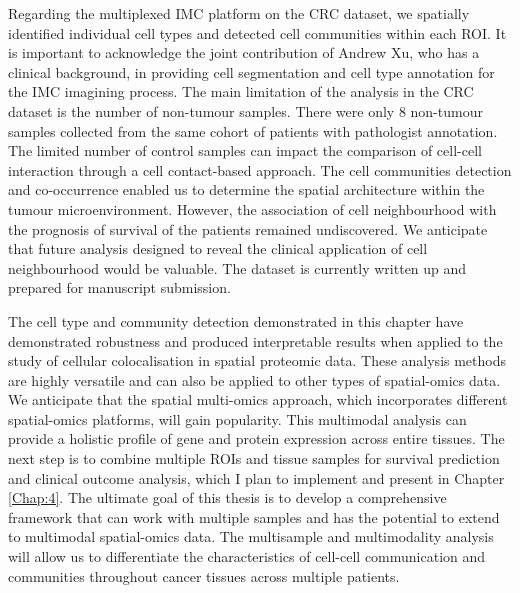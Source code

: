 Regarding the multiplexed IMC platform on the CRC dataset, we spatially identified individual cell types and detected cell communities within each ROI. It is important to acknowledge the joint contribution of Andrew Xu, who has a clinical background, in providing cell segmentation and cell type annotation for the IMC imagining process. The main limitation of the analysis in the CRC dataset is the number of non-tumour samples. There were only $8$ non-tumour samples collected from the same cohort of patients with pathologist annotation. The limited number of control samples can impact the comparison of cell-cell interaction through a cell contact-based approach. The cell communities detection and co-occurrence enabled us to determine the spatial architecture within the tumour microenvironment. However, the association of cell neighbourhood with the prognosis of survival of the patients remained undiscovered. We anticipate that future analysis designed to reveal the clinical application of cell neighbourhood would be valuable. The dataset is currently written up and prepared for manuscript submission. 

The cell type and community detection demonstrated in this chapter have demonstrated robustness and produced interpretable results when applied to the study of cellular colocalisation in spatial proteomic data. These analysis methods are highly versatile and can also be applied to other types of spatial-omics data. We anticipate that the spatial multi-omics approach, which incorporates different spatial-omics platforms, will gain popularity. This multimodal analysis can provide a holistic profile of gene and protein expression across entire tissues. The next step is to combine multiple ROIs and tissue samples for survival prediction and clinical outcome analysis, which I plan to implement and present in Chapter \ref{Chap:4}. The ultimate goal of this thesis is to develop a comprehensive framework that can work with multiple samples and has the potential to extend to multimodal spatial-omics data. The multisample and multimodality analysis will allow us to differentiate the characteristics of cell-cell communication and communities throughout cancer tissues across multiple patients. 

